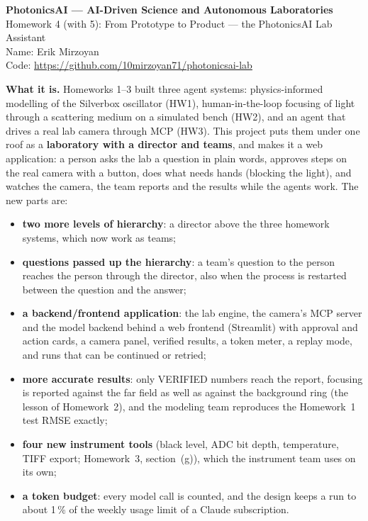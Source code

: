 \documentclass[11pt,a4paper]{article}
\newcommand{\studentname}{Erik Mirzoyan}
\newcommand{\repourl}{https://github.com/10mirzoyan71/photonicsai-lab}
\begin{document}
\begin{center}
{\Large\bfseries PhotonicsAI --- AI-Driven Science and Autonomous Laboratories}\\[3pt]
{\large Homework 4 (with 5): From Prototype to Product --- the PhotonicsAI Lab Assistant}\\[6pt]
Name: \studentname\\[2pt]
Code: \url{\repourl}
\end{center}

\textbf{What it is.} Homeworks 1--3 built three agent systems: physics-informed modelling of the Silverbox oscillator
(HW1), human-in-the-loop focusing of light through a scattering medium on a simulated bench (HW2), and an agent that
drives a real lab camera through MCP (HW3). This project puts them under one roof as a \textbf{laboratory with a director
and teams}, and makes it a web application: a person asks the lab a question in plain words, approves steps on the real
camera with a button, does what needs hands (blocking the light), and watches the camera, the team reports and the
results while the agents work. The new parts are:
\begin{itemize}[leftmargin=*,itemsep=1pt]
\item \textbf{two more levels of hierarchy}: a director above the three homework systems, which now work as teams;
\item \textbf{questions passed up the hierarchy}: a team's question to the person reaches the person through the director,
  also when the process is restarted between the question and the answer;
\item \textbf{a backend/frontend application}: the lab engine, the camera's MCP server and the model backend behind a
  web frontend (Streamlit) with approval and action cards, a camera panel, verified results, a token meter, a replay
  mode, and runs that can be continued or retried;
\item \textbf{more accurate results}: only VERIFIED numbers reach the report, focusing is reported against the far field
  as well as against the background ring (the lesson of Homework~2), and the modeling team reproduces the Homework~1
  test RMSE exactly;
\item \textbf{four new instrument tools} (black level, ADC bit depth, temperature, TIFF export; Homework~3, section~(g)),
  which the instrument team uses on its own;
\item \textbf{a token budget}: every model call is counted, and the design keeps a run to about 1\,\% of the weekly
  usage limit of a Claude subscription.
\end{itemize}
\end{document}
